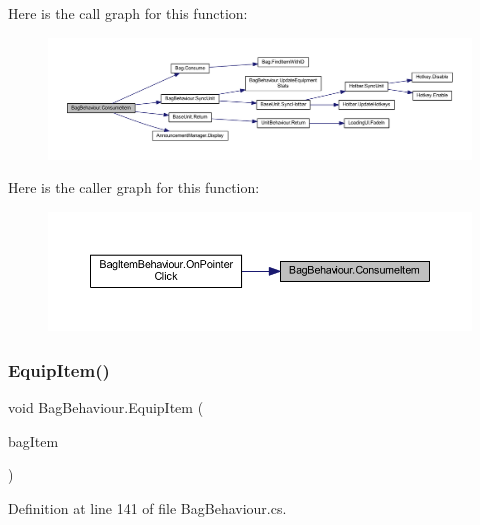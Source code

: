 Here is the call graph for this function\+:
\nopagebreak
\begin{figure}[H]
\begin{center}
\leavevmode
\includegraphics[width=350pt]{class_bag_behaviour_a407231bcd34e96129c9ae624a484a045_cgraph}
\end{center}
\end{figure}
Here is the caller graph for this function\+:
\nopagebreak
\begin{figure}[H]
\begin{center}
\leavevmode
\includegraphics[width=350pt]{class_bag_behaviour_a407231bcd34e96129c9ae624a484a045_icgraph}
\end{center}
\end{figure}
\mbox{\label{class_bag_behaviour_a472cbdd4764a3f7980c19d83b3789651}} 
\subsubsection{\texorpdfstring{EquipItem()}{EquipItem()}}
{\footnotesize\ttfamily void Bag\+Behaviour.\+Equip\+Item (\begin{DoxyParamCaption}\item[{\mbox{\hyperlink{class_bag_item_behaviour}{Bag\+Item\+Behaviour}}}]{bag\+Item }\end{DoxyParamCaption})}



Definition at line 141 of file Bag\+Behaviour.\+cs.

